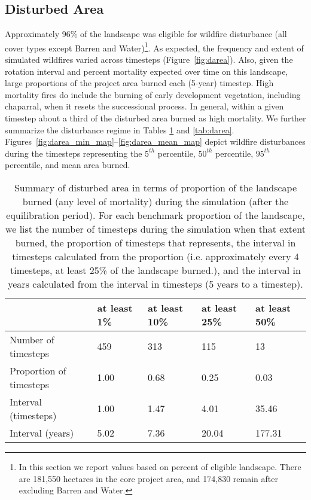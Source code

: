 \subsection{Disturbed Area} 

Approximately 96\% of the landscape was eligible for wildfire disturbance (all cover types except Barren and Water)\footnote{In this section we report values based on percent of eligible landscape. There are 181,550 hectares in the core project area, and 174,830 remain after excluding Barren and Water.}. As expected, the frequency and extent of simulated wildfires varied across timesteps (Figure~\ref{fig:darea}). Also, given the rotation interval and percent mortality expected over time on this landscape, large proportions of the project area burned each (5-year) timestep. High mortality fires do include the burning of early development vegetation, including chaparral, when it resets the successional process. In general, within a given timestep about a third of the disturbed area burned as high mortality. We further summarize the disturbance regime in Tables \ref{tab:darea_atleast} and \ref{tab:darea}. Figures~\ref{fig:darea_min_map}--\ref{fig:darea_mean_map} depict wildfire disturbances during the timesteps representing the $5^{th}$ percentile, $50^{th}$ percentile, $95^{th}$ percentile, and mean area burned. 

\begin{table}[!htbp]
\centering
\caption{Summary of disturbed area in terms of proportion of the landscape burned (any level of mortality) during the simulation (after the equilibration period). For each benchmark proportion of the landscape, we list the number of timesteps during the simulation when that extent burned, the proportion of timesteps that represents, the interval in timesteps calculated from the proportion (i.e. approximately every 4 timesteps, at least 25\% of the landscape burned.), and the interval in years calculated from the interval in timesteps (5 years to a timestep).}
\label{tab:darea_atleast}
\begin{tabular}{@{}lllll@{}}
\toprule
                           & at least 1\%     & at least 10\%    & at least 25\%    & at least 50\% \\ \midrule
Number of timesteps        & 459              & 313              & 115              & 13            \\
Proportion of timesteps    & 1.00             & 0.68             & 0.25             & 0.03          \\
Interval (timesteps)       & 1.00             & 1.47             & 4.01             & 35.46         \\
Interval (years)           & 5.02             & 7.36             & 20.04            & 177.31        \\ \bottomrule
\end{tabular}
\end{table}

